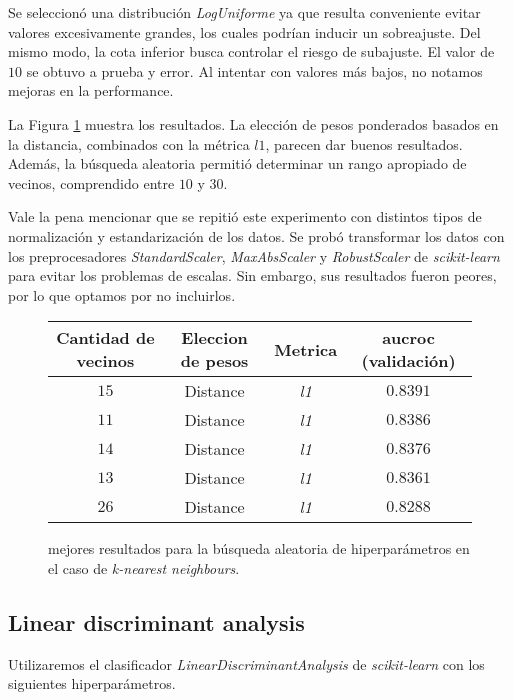 Se seleccionó una distribución \textit{LogUniforme} ya que resulta conveniente evitar valores excesivamente grandes, los cuales podrían inducir un sobreajuste. Del mismo modo, la cota inferior busca controlar el riesgo de subajuste. El valor de $10$ se obtuvo a prueba y error. Al intentar con valores más bajos, no notamos mejoras en la performance. 

La Figura \ref{knn} muestra los resultados. La elección de pesos ponderados basados en la distancia, combinados con la métrica $l1$, parecen dar buenos resultados. Además, la búsqueda aleatoria permitió determinar un rango apropiado de vecinos, comprendido entre $10$ y $30$.

Vale la pena mencionar que se repitió este experimento con distintos tipos de normalización y estandarización de los datos. Se probó transformar los datos con los preprocesadores \textit{StandardScaler}, \textit{MaxAbsScaler} y \textit{RobustScaler} de \textit{scikit-learn} para evitar los problemas de escalas. Sin embargo, sus resultados fueron peores, por lo que optamos por no incluirlos.
  
\vspace{0.5em}
\begin{figure}[!htbp]
    \begin{center}
        \begin{tabular}{ |c|c|c|c| } 
         \hline
        Cantidad de vecinos & Eleccion de pesos & Metrica  & aucroc (validación) \\
        \hline
        $15$             & Distance          & \textit{l1} & $0.8391$  \\ 
        $11$             & Distance          & \textit{l1} & $0.8386$  \\
        $14$             & Distance          & \textit{l1} & $0.8376$  \\ 
        $13$             & Distance          & \textit{l1} & $0.8361$  \\
        $26$             & Distance          & \textit{l1} & $0.8288$  \\ 
        \hline
        \end{tabular}
    \end{center}
    \caption{mejores resultados para la búsqueda aleatoria de hiperparámetros en el caso de \textit{k-nearest neighbours}.} \label{knn}
\end{figure}

\subsection{Linear discriminant analysis}
Utilizaremos el clasificador \textit{LinearDiscriminantAnalysis} de \textit{scikit-learn} con los siguientes hiperparámetros. 

